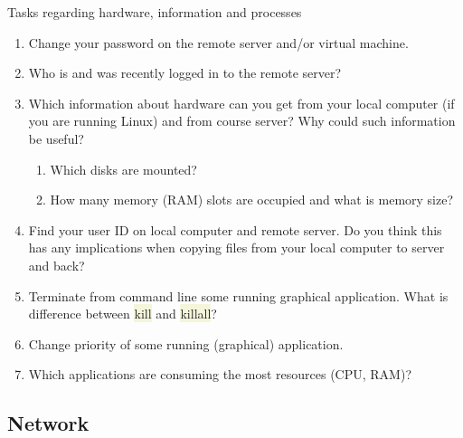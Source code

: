 \documentclass[compress, xelatex, 11pt, xcolor=svgnames, aspectratio=169,
	hyperref={
		bookmarks=true,
		unicode=true,
		colorlinks=true,
		pdftitle={Linux, command line and MetaCentrum},
		plainpages=false,
		pdfauthor={Vojtech Zeisek},
		pdfsubject={Course about use of Linux command line, writing shell scripts and using MetaCentrum of CESNET},
		pdfcreator={XeLaTeX},
		pdfkeywords={Linux, GNU, BASH, shell, command line, MetaCentrum},
		linkcolor=DarkRed, %
		anchorcolor=DarkBlue, %
		citecolor=Indigo, %
		filecolor=NavyBlue, %
		menucolor=DarkMagenta, %
		urlcolor=DarkBlue, %
		},
	url={hyphens, lowtilde} %
	]{beamer}
\renewcommand{\texttt}[1]{\colorbox{Beige}{{\ttfamily #1}}}
\begin{document}
\begin{frame}{Tasks regarding hardware, information and processes}
	\begin{enumerate}
		\item Change your password on the remote server and/or virtual machine.
		\item Who is and was recently logged in to the remote server?
		\item Which information about hardware can you get from your local computer (if you are running Linux) and from course server? Why could such information be useful?
	\begin{enumerate}
		\item Which disks are mounted?
		\item How many memory (RAM) slots are occupied and what is memory size?
	\end{enumerate}
	\item Find your user ID on local computer and remote server. Do you think this has any implications when copying files from your local computer to server and back?
	\item Terminate from command line some running graphical application. What is difference between \texttt{kill} and \texttt{killall}?
	\item Change priority of some running (graphical) application.
	\item Which applications are consuming the most resources (CPU, RAM)?
	\end{enumerate}
\end{frame}

\subsection{Network}
\end{document}
